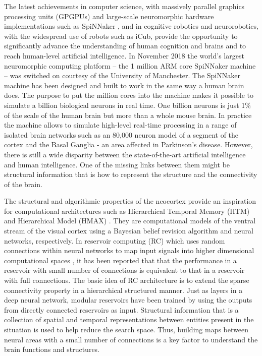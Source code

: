 \documentclass[letterpaper, 10 pt, conference]{ieeeconf}  %
\begin{document}
The latest achievements in computer science, with massively parallel graphics processing units (GPGPUs) and large-scale neuromorphic hardware implementations such as SpiNNaker \cite{Furber2013}, and in cognitive robotics and neurorobotics, with the widespread use of robots such as iCub, provide the opportunity to significantly advance the understanding of human cognition and brains and to reach human-level artificial intelligence. 
In November 2018 the world’s largest neuromorphic computing platform -- the 1 million ARM core SpiNNaker machine \cite{Furber2020}-- was switched on courtesy of the University of Manchester.
The SpiNNaker machine has been designed and built to work in the same way a human brain does.
The purpose to put the million cores into the machine makes it possible to simulate a billion biological neurons in real time.
One billion neurons is just 1\% of the scale of the human brain but more than a whole mouse brain. 
In practice the machine allows to simulate high-level real-time processing in a range of isolated brain networks such as 
an 80,000 neuron model of a segment of the cortex and the Basal Ganglia - an area affected in Parkinson’s disease.
However, there is still a wide disparity between the state-of-the-art artificial intelligence and human intelligence.
One of the missing links between them might be structural information that is how to represent the structure and the connectivity of the brain.

The structural and algorithmic properties of the neocortex provide an inspiration for computational architectures \cite{schmidhuber2015deep} such as Hierarchical Temporal Memory (HTM) \cite{Hawkins2004} and  Hierarchical Model (HMAX) \cite{Riesenhuber1999}.
They are computational models of the ventral stream of the visual cortex using a Bayesian belief revision algorithm and neural networks, respectively.
In reservoir computing (RC) which uses random connections within neural networks to map input signals into higher dimensional computational spaces \cite{Lukosevicius2009, DeAzambuja2016a}, it has been reported that that the performance in a reservoir with small number of connections is equivalent to that in a reservoir with full connections.
The basic idea of RC architecture is to extend the sparse connectivity property in a hierarchical structured manner.
Just as layers in a deep neural network, modular reservoirs have been trained by using the outputs from directly connected reservoirs as input.
Structural information that is a collection of spatial and temporal representations between entities present in the situation is used to help reduce the search space.
Thus, building maps between neural areas with a small number of connections is a key factor to understand the brain functions and structures.
\end{document}
